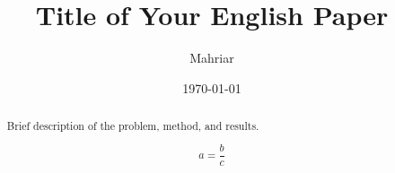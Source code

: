\documentclass[11pt]{article}
\title{Title of Your English Paper}
\author{Mahriar}
\date{\today}
\begin{document}
\maketitle

\begin{abstract}
Brief description of the problem, method, and results.

\[ a = \frac{b}{c} \]

\end{abstract}


\newpage

\newpage

\newpage


% 
% 
\end{document}
